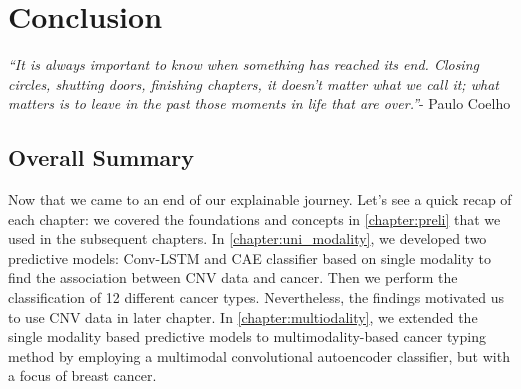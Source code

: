 \chapter{Conclusion}\label{chapter:end}
\textit{``It is always important to know when something has reached its end. Closing circles, shutting doors, finishing chapters, it doesn't matter what we call it; what matters is to leave in the past those moments in life that are over.''}- Paulo Coelho

\section{Overall Summary}
Now that we came to an end of our explainable journey. Let's see a quick recap of each chapter: we covered the foundations and concepts in \cref{chapter:preli} that we used in the subsequent chapters. In \cref{chapter:uni_modality}, we developed two predictive models: Conv-LSTM and CAE classifier based on single modality to find the association between CNV data and cancer. Then we perform the classification of 12 different cancer types. Nevertheless, the findings motivated us to use CNV data in later chapter. In \cref{chapter:multiodality}, we extended the single modality based predictive models to multimodality-based cancer typing method by employing a multimodal convolutional autoencoder classifier, but with a focus of breast cancer. 

